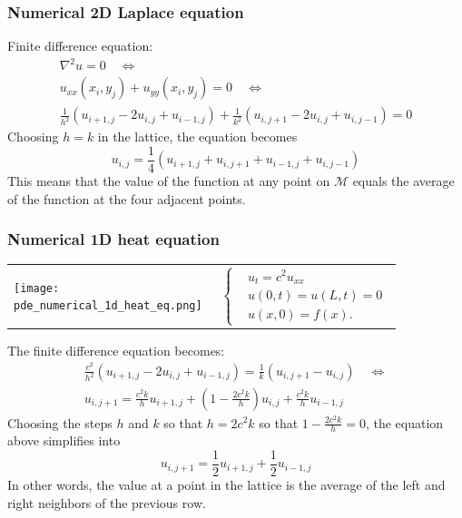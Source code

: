 \subsubsection{Numerical 2D Laplace equation}
Finite difference equation:
\begin{gather*}
    \nabla^2 u = 0 \quad \Leftrightarrow \\
    u_{xx}(x_i,y_j) + u_{yy}(x_i,y_j) = 0 \quad \Leftrightarrow \\
    \frac{1}{h^2}(u_{i+1,j}-2u_{i,j}+u_{i-1,j})+\frac{1}{k^2}(u_{i,j+1}-2u_{i,j}+u_{i,j-1})=0
\end{gather*}
Choosing $h=k$ in the lattice, the equation becomes
\begin{equation*}
    u_{i,j}=\frac14(u_{i+1,j}+u_{i,j+1}+u_{i-1,j}+u_{i,j-1})
\end{equation*}
This means that the value of the function at any point on $\mathcal{M}$ equals the average of the function at the four adjacent points.

\subsubsection{Numerical 1D heat equation}

\begin{tabular}{ m{0.4\linewidth}  m{0.45\linewidth} }
    {
        \texttt{[image: pde\_numerical\_1d\_heat\_eq.png]}
    }
     &
    {
            \begin{equation*}
                \begin{cases}
                     & u_t=c^2u_{xx}   \\
                     & u(0,t)=u(L,t)=0 \\
                     & u(x,0)=f(x).
                \end{cases}
            \end{equation*}
        }
\end{tabular}

The finite difference equation becomes:
\begin{gather*}
    \frac{c^2}{h^2}(u_{i+1,j}-2u_{i,j}+u_{i-1,j})=\frac1k(u_{i,j+1}-u_{i,j}) \quad \Leftrightarrow \\
    u_{i,j+1}=\frac{c^2k}{h}u_{i+1,j}+\left(1-\frac{2c^2k}{h}\right)u_{i,j}+\frac{c^2k}{h}u_{i-1,j}
\end{gather*}
Choosing the steps $h$ and $k$ so that $h=2c^2k$ so that $1-\frac{2c^2k}{h}=0$, the equation above simplifies into
\begin{equation*}
    u_{i,j+1}=\frac{1}{2}u_{i+1,j}+\frac{1}{2}u_{i-1,j}
\end{equation*}
In other words, the value at a point in the lattice is the average of the left and right neighbors of the previous row.

